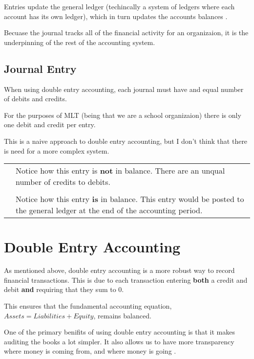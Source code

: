 Entries update the general ledger (techincally a system of ledgers where each account has its own ledger), which in turn updates the accounts balances \cite{NetsuiteJournal}.

Becuase the journal tracks all of the financial activity for an organizaion, it is the underpinning of the rest of the accounting system.

\subsection{Journal Entry}

When using double entry accounting, each journal must have and equal number of debits and credits.

For the purposes of MLT (being that we are a school organizaion) there is only one debit and credit per entry.

This is a naive approach to double entry accounting, but I don't think that there is need for a more complex system.

\begin{tabular}{C{.5\linewidth}|L{.5\linewidth}}
     & Notice how this entry is \textbf{not} in balance. There are an unqual number of credits to debits.\\
    \\
     & Notice how this entry \textbf{is} in balance. This entry would be posted to the general ledger at the end of the accounting period.\\
\end{tabular}

\section{Double Entry Accounting} \label{DoubleEntryAccounting}

As mentioned above, double entry accounting is a more robust way to record financial transactions. This is due to each transaction entering \textbf{both} a credit and debit \textbf{and} requiring that they sum to 0.

This ensures that the fundamental accounting equation, $\textit{Assets} = \textit{Liabilities} + \textit{Equity}$, remains balanced.

One of the primary benifits of using double entry accounting is that it makes auditing the books a lot simpler. It also allows us to have more transparency where money is coming from, and where money is going \cite{NetsuiteJournal}.

